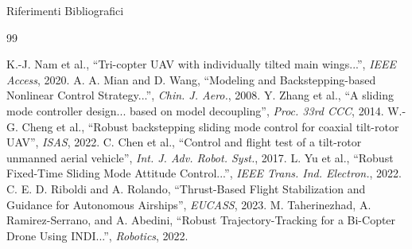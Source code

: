 \documentclass[aspectratio=169]{beamer}
\begin{document}
\begin{frame}[allowframebreaks]{Riferimenti Bibliografici}
    \tiny 
    \begin{thebibliography}{99}
        
         K.-J. Nam et al., ``Tri-copter UAV with individually tilted main wings...'', \textit{IEEE Access}, 2020.
         A. A. Mian and D. Wang, ``Modeling and Backstepping-based Nonlinear Control Strategy...'', \textit{Chin. J. Aero.}, 2008.
         Y. Zhang et al., ``A sliding mode controller design... based on model decoupling'', \textit{Proc. 33rd CCC}, 2014.
         W.-G. Cheng et al., ``Robust backstepping sliding mode control for coaxial tilt-rotor UAV'', \textit{ISAS}, 2022.
         C. Chen et al., ``Control and flight test of a tilt-rotor unmanned aerial vehicle'', \textit{Int. J. Adv. Robot. Syst.}, 2017.
         L. Yu et al., ``Robust Fixed-Time Sliding Mode Attitude Control...'', \textit{IEEE Trans. Ind. Electron.}, 2022.
         C. E. D. Riboldi and A. Rolando, ``Thrust-Based Flight Stabilization and Guidance for Autonomous Airships'', \textit{EUCASS}, 2023.
         M. Taherinezhad, A. Ramirez-Serrano, and A. Abedini, ``Robust Trajectory-Tracking for a Bi-Copter Drone Using INDI...'', \textit{Robotics}, 2022.

    \end{thebibliography}
\end{frame}
\end{document}
